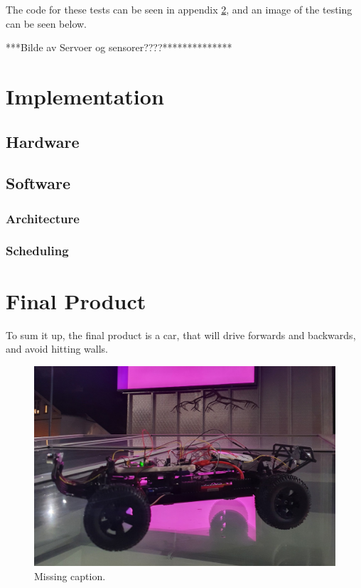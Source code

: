 \documentclass{article}
\begin{document}
The code for these tests can be seen in appendix \ref{}, and an image of the testing can be seen below. 

***Bilde av Servoer og sensorer????**************

\section{Implementation}

\subsection{Hardware}

\subsection{Software}

\subsubsection{Architecture}

\subsubsection{Scheduling}


\section{Final Product}

To sum it up, the final product is a car, that will drive forwards and backwards, and avoid hitting walls. 

\begin{figure}[H]
	\centering
	\includegraphics[width=\linewidth]{showcase.png}
	\caption{Missing caption.}
	\label{showcase}
\end{figure}
\end{document}
